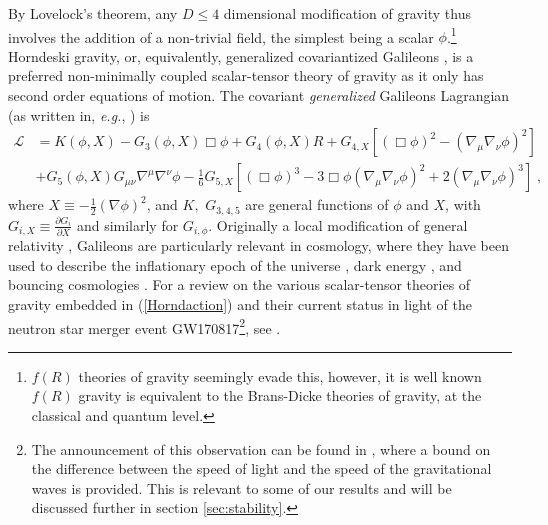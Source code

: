 \documentclass[amsmath,amssymb,11pt]{article}
\newcommand{\beq}{\begin{equation}}
\newcommand{\eeq}{\end{equation}}
\begin{document}
By Lovelock's theorem, any $D\leq4$ dimensional modification of gravity thus involves the addition of a non-trivial field, the simplest being a scalar $\phi$.\footnote{$f(R)$ theories of gravity seemingly evade this, however, it is well known $f(R)$ gravity is equivalent to the Brans-Dicke theories of gravity, at the classical and quantum level.} Horndeski gravity, or, equivalently, generalized covariantized Galileons \cite{Deffayet:2009wt,Deffayet:2009mn,Deffayet:2011gz}, is a preferred  non-minimally coupled scalar-tensor theory of gravity as it only has second order equations of motion. The covariant \emph{generalized} Galileons Lagrangian (as written in, \emph{e.g.}, \cite{Kobayashi:2011nu,Charmousis14-1}) is 
 \beq 
 \begin{split}
 \mathcal{L}&=K(\phi,X)-G_{3}(\phi,X)\Box\phi+G_{4}(\phi,X)R+G_{4,X}\left[(\Box\phi)^{2}-(\nabla_{\mu}\nabla_{\nu}\phi)^{2}\right]\\
 &+G_{5}(\phi,X)G_{\mu\nu}\nabla^{\mu}\nabla^{\nu}\phi-\frac{1}{6}G_{5,X}\left[(\Box\phi)^{3}-3\Box\phi(\nabla_{\mu}\nabla_{\nu}\phi)^{2}+2(\nabla_{\mu}\nabla_{\nu}\phi)^{3}\right]\;,
 \end{split}
\label{Horndaction} \eeq
where $X\equiv-\frac{1}{2}(\nabla\phi)^{2}$, and $K,$ $G_{3,4,5}$ are general functions of $\phi$ and $X$, with $G_{i,X}\equiv\frac{\partial G_{i}}{\partial X}$ and similarly for $G_{i,\phi}$. Originally a local modification of general relativity \cite{Nicolis:2008in}, Galileons are particularly relevant in cosmology, where they have been used to describe the inflationary epoch of the universe \cite{Silva:2009km,Creminelli10-1,Kobayashi:2010cm}, dark energy \cite{Deffayet:2010qz}, and bouncing cosmologies \cite{Qiu:2011cy,Easson:2011zy,Cai:2012va,Rubakov13-1,Ijjas16-1}. For a review on the various scalar-tensor theories of gravity embedded in (\ref{Horndaction}) and their current status in light of the neutron star merger event GW170817\footnote{The announcement of this observation can be found in \cite{Monitor:2017mdv}, where a bound on the difference between the speed of light and the speed of the gravitational waves is provided. This is relevant to some of our results and will be discussed further in section \ref{sec:stability}. }, see \cite{Kase:2018aps}.


\end{document}
